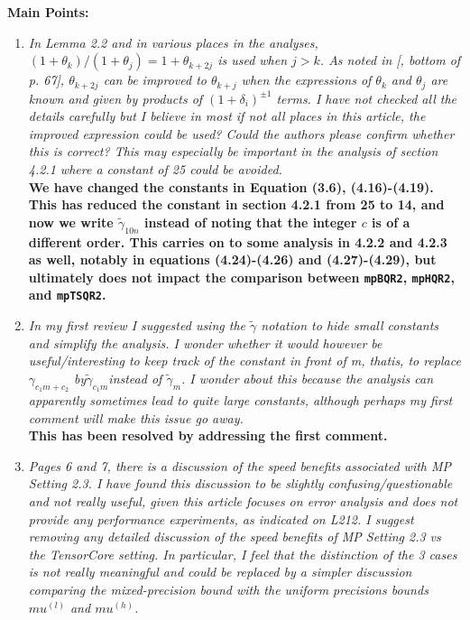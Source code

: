 \documentclass[final,onefignum,onetabnum]{siamart190516}
\begin{document}
\textbf{Main Points:}
\begin{enumerate}
    \item {\it In Lemma 2.2 and in various places in the analyses, $(1+\theta_{k})/(1+\theta_{j}) = 1+\theta_{k+2j}$ is used when $j > k$. As noted in [\cite{Higham2002}, bottom of p. 67], $\theta_{k+2j}$ can be improved to $\theta_{k+j}$ when the expressions of $\theta_{k}$ and $\theta_{j}$ are known and given by products of $(1 + \delta_i)^{\pm 1}$ terms. I have not checked all the details carefully but I believe in most if not all places in this article, the improved expression could be used? Could the authors please confirm whether this is correct? This may especially be important in the analysis of section 4.2.1 where a constant of 25 could be avoided.}\\
    {\bf We have changed the constants in Equation (3.6), (4.16)-(4.19). 
    This has reduced the constant in section 4.2.1 from 25 to 14, and now we write $\tilde{\gamma}_{10 n}$ instead of noting that the integer $c$ is of a different order. 
    This carries on to some analysis in 4.2.2 and 4.2.3 as well, notably in equations (4.24)-(4.26) and (4.27)-(4.29), but ultimately does not impact the comparison between {\tt mpBQR2}, {\tt mpHQR2}, and {\tt mpTSQR2}.
    }
    \item {\it In my first review I suggested using the $\tilde{\gamma}$  notation to hide small constants and simplify the analysis. I wonder whether it would however be useful/interesting to keep track of the constant in front of m, thatis, to replace $\gamma_{c_1m+c_2}$ by$\tilde{\gamma}_{c_1m}$instead of $\tilde{\gamma}_{m}$. I wonder about this because the analysis can apparently sometimes lead to quite large constants, although perhaps my first comment will make this issue go away.}\\
    {\bf This has been resolved by addressing the first comment.}
    \item {\it Pages 6 and 7, there is a discussion of the speed benefits associated with MP Setting 2.3. I have found this discussion to be slightly confusing/questionable and not really useful, given this article focuses on error analysis and does not provide any performance experiments, as indicated on L212. I suggest removing any detailed discussion of the speed benefits of MP Setting 2.3 vs the TensorCore setting. In particular, I feel that the distinction of the 3 cases is not really meaningful and could be replaced by a simpler discussion comparing the mixed-precision bound with the uniform precisions bounds $mu^{(l)}$ and $mu^{(h)}$.}\\

\end{enumerate}
\end{document}
